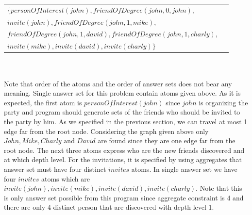 \documentclass[14pt,a4paper, titlepage]{article}
\begin{document}
\begin{tabular}{ l r }
   $\mathit{\{personOfInterest(john), friendOfDegree(john,0,john), }$& \\
   $\mathit{invite(john), friendOfDegree(john,1,mike),}$& \\
   $\mathit{friendOfDegree(john,1,david), friendOfDegree(john,1,charly),}$ & \\
   $\mathit{invite(mike),invite(david),invite(charly)\}}$
 \end{tabular}
\\ \\
Note that order of the atoms and the order of answer sets does not bear any meaning. Single answer set for this problem contain atoms given above. As it is expected, the first atom is $\mathit{personOfInterest(john)}$ 
since $\mathit{john}$ is organizing the party and program should generate sets of the friends who should be invited to the party by him. As we specified in the previous section, we can travel at most 1 edge far from the root node. Considering the graph given above only $\mathit{John, Mike, Charly} \text{ and } \mathit{David}$ are found since they are one edge far from the root node. The next three atoms express who are the new friends discovered and at which depth 
level. For the invitations, it is specified by using aggregates that answer set must have four distinct $\mathit{invites}$ atoms.
In single answer set we have four $\mathit{invites}$ atoms which are $\mathit{invite(john), 
invite(mike), invite(david), invite(charly)}$. Note that this is only answer set possible 
from this program since aggregate constraint is 4 and there are only 4 distinct person that are discovered with depth level 1. 
\end{document}
